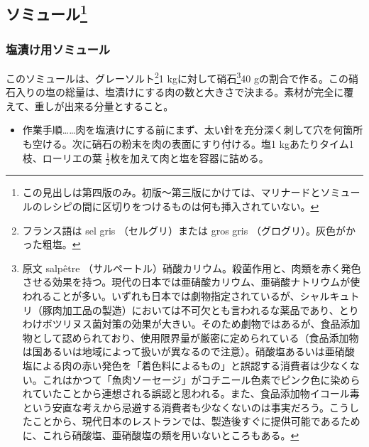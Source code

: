\hypertarget{saumures}{%
\subsection[ソミュール]{\texorpdfstring{ソミュール\footnote{この見出しは第四版のみ。初版〜第三版にかけては、マリナードとソミュールのレシピの間に区切りをつけるものは何も挿入されていない。}}{ソミュール}}\label{saumures}}


 
\begin{recette}
\hypertarget{saumure-au-sel}{%
\subsubsection{塩漬け用ソミュール}\label{saumure-au-sel}}



このソミュールは、グレーソルト\footnote{フランス語は sel gris
  （セルグリ）または gros gris （グログリ）。灰色がかった粗塩。}1
kgに対して硝石\footnote{原文 salpêtre
  （サルペートル）硝酸カリウム。殺菌作用と、肉類を赤く発色させる効果を持つ。現代の日本では亜硝酸カリウム、亜硝酸ナトリウムが使われることが多い。いずれも日本では劇物指定されているが、シャルキュトリ（豚肉加工品の製造）においては不可欠とも言われるな薬品であり、とりわけボツリヌス菌対策の効果が大きい。そのため劇物ではあるが、食品添加物として認められており、使用限界量が厳密に定められている（食品添加物は国あるいは地域によって扱いが異なるので注意）。硝酸塩あるいは亜硝酸塩による肉の赤い発色を「着色料によるもの」と誤認する消費者は少なくない。これはかつて「魚肉ソーセージ」がコチニール色素でピンク色に染められていたことから連想される誤認と思われる。また、食品添加物イコール毒という安直な考えから忌避する消費者も少なくないのは事実だろう。こうしたことから、現代日本のレストランでは、製造後すぐに提供可能であるために、これら硝酸塩、亜硝酸塩の類を用いないところもある。}40
gの割合で作る。この硝石入りの塩の総量は、塩漬けにする肉の数と大きさで決まる。素材が完全に覆えて、重しが出来る分量とすること。

\begin{itemize}
\tightlist
\item
  作業手順\ldots{}\ldots{}肉を塩漬けにする前にまず、太い針を充分深く刺して穴を何箇所も空ける。次に硝石の粉末を肉の表面にすり付ける。塩1
  kgあたりタイム1枝、ローリエの葉
  \(\frac{1}{2}\)枚を加えて肉と塩を容器に詰める。
\end{itemize}


\end{recette}
